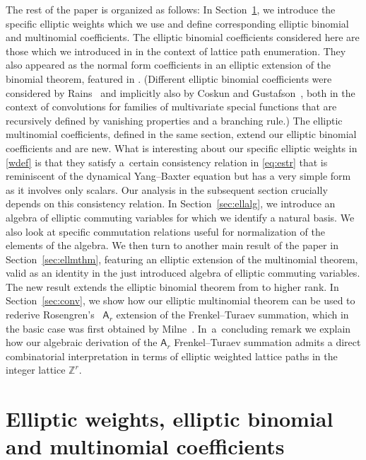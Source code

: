 \documentclass[10pt,a4paper]{amsart}
\numberwithin{equation}{section}
\theoremstyle{definition}
\begin{document}
The rest of the paper is organized as follows:
In Section~\ref{sec:bmcoeffs}, we introduce the specific
elliptic weights which we use and define corresponding
elliptic binomial and multinomial coefficients.
The elliptic binomial coefficients considered
here are those which we introduced in \cite{S}
in the context of lattice path enumeration.
They also appeared as the normal form coefficients in an
elliptic extension of the binomial theorem, featured in
\cite[Section~4]{S1}. (Different elliptic binomial coefficients
were considered by Rains~\cite[Definition~11]{R06}
and implicitly also by Coskun and Gustafson~\cite{CG},
both in the context of convolutions for families of multivariate
special functions that are recursively defined by vanishing
properties and a branching rule.)
The elliptic multinomial coefficients, defined in the same section,
extend our elliptic binomial coefficients and are new.
What is interesting about our specific elliptic weights in \eqref{wdef}
is that they satisfy a~certain consistency relation in \eqref{eq:estr}
that is reminiscent of the dynamical Yang--Baxter
equation but has a very simple form as it
involves only scalars. Our analysis in the subsequent section
crucially depends on this consistency relation.
In Section~\ref{sec:ellalg}, we introduce an
algebra of elliptic commuting variables for which we
identify a natural basis. We also look at specific
commutation relations useful for normalization
of the elements of the algebra.
We then turn to another main result of the paper in
Section~\ref{sec:ellmthm}, featuring an elliptic extension
of the multinomial theorem, valid as an identity in the
just introduced algebra of elliptic commuting variables.
The new result extends the elliptic binomial theorem from
\cite[Section~4]{S1} to higher rank. In Section~\ref{sec:conv},
we show how our elliptic
multinomial theorem can be used to rederive
Rosengren's~\cite[Theorem~5.1]{R04} $\mathsf A_r$
extension of the Frenkel--Turaev summation,
which in the basic case was first obtained by
Milne~\cite[Theorem~6.17]{M88}.
In~a~concluding remark we explain how our algebraic derivation
of the $\mathsf A_r$ Frenkel--Turaev summation admits
a direct combinatorial interpretation in terms of elliptic
weighted lattice paths in the integer lattice $\mathbb Z^r$.


\section{Elliptic weights, elliptic binomial and
 multinomial coefficients}\label{sec:bmcoeffs}
\end{document}
